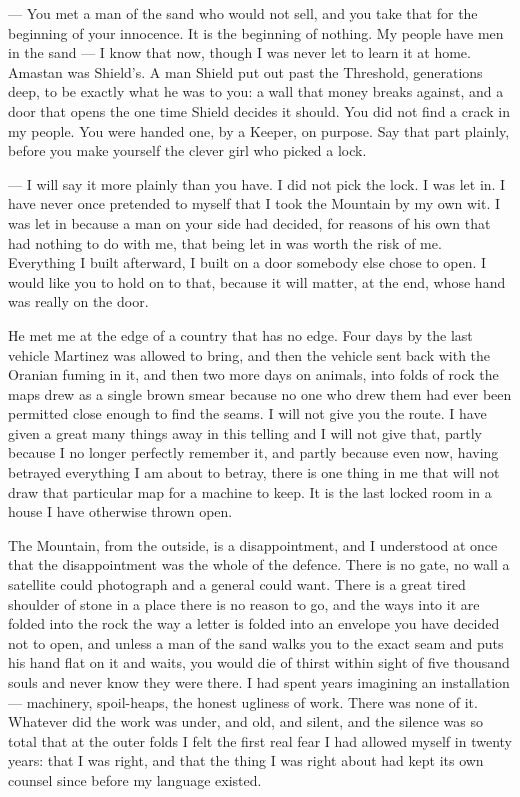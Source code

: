 \begin{room}

--- You met a man of the sand who would not sell, and you take that for the beginning of your innocence. It is the beginning of nothing. My people have men in the sand --- I know that now, though I was never let to learn it at home. Amastan was Shield's. A man Shield put out past the Threshold, generations deep, to be exactly what he was to you: a wall that money breaks against, and a door that opens the one time Shield decides it should. You did not find a crack in my people. You were handed one, by a Keeper, on purpose. Say that part plainly, before you make yourself the clever girl who picked a lock.

--- I will say it more plainly than you have. I did not pick the lock. I was let in. I have never once pretended to myself that I took the Mountain by my own wit. I was let in because a man on your side had decided, for reasons of his own that had nothing to do with me, that being let in was worth the risk of me. Everything I built afterward, I built on a door somebody else chose to open. I would like you to hold on to that, because it will matter, at the end, whose hand was really on the door.

\end{room}

He met me at the edge of a country that has no edge. Four days by the last vehicle Martinez was allowed to bring, and then the vehicle sent back with the Oranian fuming in it, and then two more days on animals, into folds of rock the maps drew as a single brown smear because no one who drew them had ever been permitted close enough to find the seams. I will not give you the route. I have given a great many things away in this telling and I will not give that, partly because I no longer perfectly remember it, and partly because even now, having betrayed everything I am about to betray, there is one thing in me that will not draw that particular map for a machine to keep. It is the last locked room in a house I have otherwise thrown open.\par

The Mountain, from the outside, is a disappointment, and I understood at once that the disappointment was the whole of the defence. There is no gate, no wall a satellite could photograph and a general could want. There is a great tired shoulder of stone in a place there is no reason to go, and the ways into it are folded into the rock the way a letter is folded into an envelope you have decided not to open, and unless a man of the sand walks you to the exact seam and puts his hand flat on it and waits, you would die of thirst within sight of five thousand souls and never know they were there. I had spent years imagining an installation --- machinery, spoil-heaps, the honest ugliness of work. There was none of it. Whatever did the work was under, and old, and silent, and the silence was so total that at the outer folds I felt the first real fear I had allowed myself in twenty years: that I was right, and that the thing I was right about had kept its own counsel since before my language existed.\par

